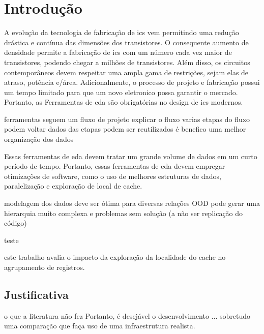 \chapter{Introdução}
\label{cap:introducao}

A evolução da tecnologia de fabricação de \acp{ic} vem permitindo uma redução drástica e contínua das dimensões dos transistores.
O consequente aumento de densidade permite a fabricação de \acp{ic} com um número cada vez maior de transistores, podendo chegar a milhões de transistores.
Além disso, os circuitos contemporâneos devem respeitar uma ampla gama de restrições, sejam elas de atraso, potência e\@/\@ou área.
Adicionalmente, o processo de projeto e fabricação possui um tempo limitado para que um novo eletronico possa garantir o mercado.
Portanto, as Ferramentas de \ac{eda} são obrigatórias no design de \acp{ic} modernos.




ferramentas seguem um fluxo de projeto
explicar o fluxo
varias etapas do fluxo podem voltar
dados das etapas podem ser reutilizados
é benefico uma melhor organização dos dados


Essas ferramentas de \ac{eda} devem tratar um grande volume de dados em um curto período de tempo. Portanto, essas ferramentas de \ac{eda} devem empregar otimizações de software, como o uso de melhores estruturas de dados, paralelização e exploração de local de cache.

modelagem dos dados deve ser ótima para diversas relações
OOD pode gerar uma hierarquia muito complexa e problemas sem solução (a não ser replicação do código)



teste





este trabalho avalia o impacto da exploração da localidade do cache no agrupamento de registros.


\section{Justificativa}
    o que a literatura não fez
    Portanto, é desejável o desenvolvimento ... sobretudo uma comparação que faça uso de uma infraestrutura realista.

